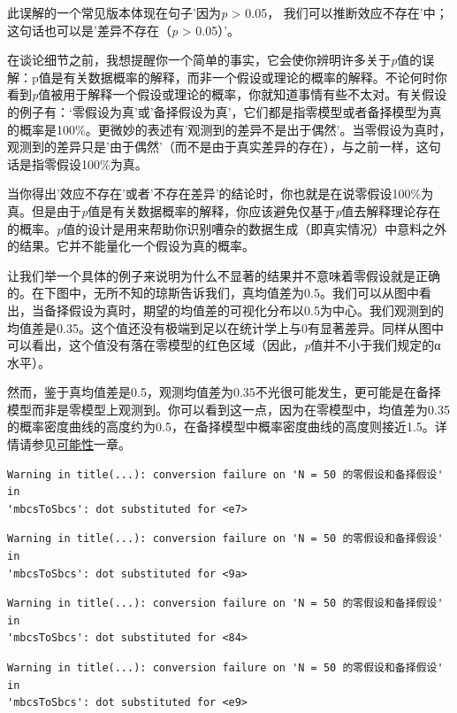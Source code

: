 \documentclass[
  letterpaper,
  DIV=11,
  numbers=noendperiod]{scrreprt}
\begin{document}
此误解的一个常见版本体现在句子'因为\emph{p} \textgreater{} 0.05，
我们可以推断效应不存在'中；这句话也可以是'差异不存在（\emph{p}
\textgreater{} 0.05）'。

在谈论细节之前，我想提醒你一个简单的事实，它会使你辨明许多关于\emph{p}值的误解：p值是有关数据概率的解释，而非一个假设或理论的概率的解释。不论何时你看到\emph{p}值被用于解释一个假设或理论的概率，你就知道事情有些不太对。有关假设的例子有：`零假设为真'或'备择假设为真'，它们都是指零模型或者备择模型为真的概率是100\%。更微妙的表述有'观测到的差异不是出于偶然'。当零假设为真时，观测到的差异只是'由于偶然'（而不是由于真实差异的存在），与之前一样，这句话是指零假设100\%为真。

当你得出'效应不存在'或者'不存在差异'的结论时，你也就是在说零假设100\%为真。但是由于\emph{p}值是有关数据概率的解释，你应该避免仅基于\emph{p}值去解释理论存在的概率。\emph{p}值的设计是用来帮助你识别嘈杂的数据生成（即真实情况）中意料之外的结果。它并不能量化一个假设为真的概率。

让我们举一个具体的例子来说明为什么不显著的结果并不意味着零假设就是正确的。在下图中，无所不知的琼斯告诉我们，真均值差为0.5。我们可以从图中看出，当备择假设为真时，期望的均值差的可视化分布以0.5为中心。我们观测到的均值差是0.35。这个值还没有极端到足以在统计学上与0有显著差异。同样从图中可以看出，这个值没有落在零模型的红色区域（因此，\emph{p}值并不小于我们规定的α水平）。

然而，鉴于真均值差是0.5，观测均值差为0.35不光很可能发生，更可能是在备择模型而非是零模型上观测到。你可以看到这一点，因为在零模型中，均值差为0.35的概率密度曲线的高度约为0.5，在备择模型中概率密度曲线的高度则接近1.5。详情请参见\protect\hyperlink{likettest}{可能性}一章。

\begin{verbatim}
Warning in title(...): conversion failure on 'N = 50 的零假设和备择假设' in
'mbcsToSbcs': dot substituted for <e7>
\end{verbatim}

\begin{verbatim}
Warning in title(...): conversion failure on 'N = 50 的零假设和备择假设' in
'mbcsToSbcs': dot substituted for <9a>
\end{verbatim}

\begin{verbatim}
Warning in title(...): conversion failure on 'N = 50 的零假设和备择假设' in
'mbcsToSbcs': dot substituted for <84>
\end{verbatim}

\begin{verbatim}
Warning in title(...): conversion failure on 'N = 50 的零假设和备择假设' in
'mbcsToSbcs': dot substituted for <e9>
\end{verbatim}
\end{document}
